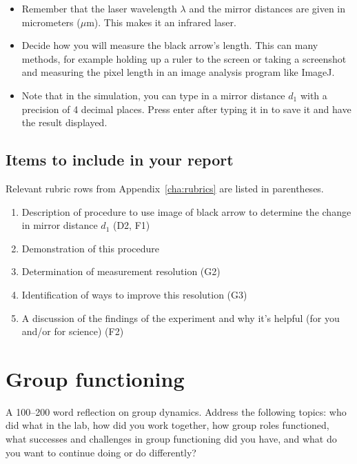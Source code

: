 \begin{itemize}
	\item Remember that the laser wavelength $\lambda$ and the mirror distances are given in micrometers ($\mu$m). This makes it an infrared laser.
	
	\item Decide how you will measure the black arrow's length. This can many methods, for example holding up a ruler to the screen or taking a screenshot and measuring the pixel length in an image analysis program like ImageJ.
	
	\item Note that in the simulation, you can type in a mirror distance $d_1$ with a precision of 4 decimal places. Press enter after typing it in to save it and have the result displayed.
\end{itemize}

\subsection{Items to include in your report}

Relevant rubric rows from Appendix~\ref{cha:rubrics} are listed in parentheses.

\begin{enumerate}
	\item Description of procedure to use image of black arrow to determine the change in mirror distance $d_1$ (D2, F1)
	\item Demonstration of this procedure
	\item Determination of measurement resolution (G2)
	\item Identification of ways to improve this resolution (G3)
	\item A discussion of the findings of the experiment and why it's helpful (for you and/or for science) (F2)
\end{enumerate}

\section{Group functioning}

\begin{steps}
	\item A 100--200 word reflection on group dynamics. Address the following topics: who did what in the lab, how did you work together, how group roles functioned, what successes and challenges in group functioning did you have, and what do you want to continue doing or do differently?
\end{steps}

